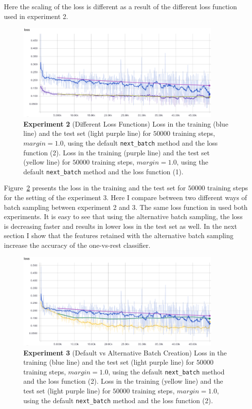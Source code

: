 \documentclass{article}
\begin{document}
Here the scaling of the loss is different as a result of the different loss function used in experiment 2.
\begin{figure}[h!]
\centering
\includegraphics[width=10.2cm]{siamese-1.png}
\caption{\textbf{Experiment 2} (Different Loss Functions) Loss in the training (blue line) and the test set (light purple line) for $50000$ training steps, $margin = 1.0$, using the default \texttt{next\_batch} method and the loss function (2).
Loss in the training (purple line) and the test set (yellow line) for $50000$ training steps, $margin = 1.0$, using the default \texttt{next\_batch} method and the loss function (1).}
\label{fig:siamese-1}
\end{figure}
Figure~\ref{fig:siamese-2} presents the loss in the training and the test set for $50000$ training steps for the setting of the experiment 3.
Here I compare between two different ways of batch sampling between experiment 2 and 3.
The same loss function in used both experiments.
It is easy to see that using the alternative batch sampling, the loss is decreasing faster and results in lower loss in the test set as well.
In the next section I show that the features retained with the alternative batch sampling increase the accuracy of the one-vs-rest classifier.
\begin{figure}[h!]
\centering
\includegraphics[width=10.2cm]{siamese-2.png}
\caption{\textbf{Experiment 3} (Default vs Alternative Batch Creation) Loss in the training (blue line) and the test set (light purple line) for $50000$ training steps, $margin = 1.0$, using the default \texttt{next\_batch} method and the loss function (2).
Loss in the training (yellow line) and the test set (light purple line) for $50000$ training steps, $margin = 1.0$, using the default \texttt{next\_batch} method and the loss function (2).}
\label{fig:siamese-2}
\end{figure}
\end{document}
